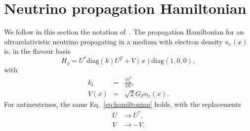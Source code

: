 \documentclass{article}
\newcommand{\de}[0]{\text{d}}
\begin{document}
%

\section{Neutrino propagation Hamiltonian}
We follow in this section the notation of~\cite{Fantini:2018itu}.
The propagation Hamiltonian for an ultrarelativistic neutrino propagating in a medium with electron density $n_e(x)$ is, in the flavour basis
\begin{equation}\label{eq:hamiltonian}
	H_\nu = U^* \text{diag}(k) U^T + V(x) \text{diag}(1,0,0),
\end{equation}
with
\begin{eqnarray}
	k_i &=& \frac{m_i^2}{2E},\\
	V(x) &=& \sqrt{2}G_F n_e(x).
\end{eqnarray}
For antineutrinos, the same Eq.~\ref{eq:hamiltonian} holds, with the replacements
\begin{eqnarray}
	U &\rightarrow U^*,\\
	V &\rightarrow -V.
\end{eqnarray}
\end{document}
